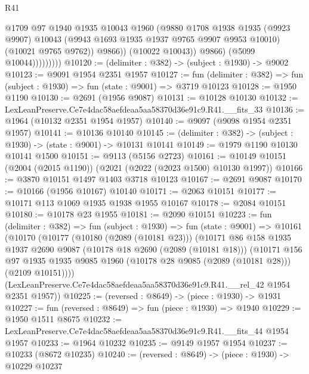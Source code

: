 \begin{lexlean}{R41}
\begin{coremodule}
                            @1709
                            @97
                            @1940
                            @1935
                            @10043
                            @1960
                            (@9880
                              @1708
                              @1938
                              @1935
                              (@9923 @9907)
                              @10043
                              (@9943 @1693 @1935 @1937 @9765 @9907 @9953 @10010)
                              (@10021 @9765 @9762))
                            @9866))
                        (@10022 @10043))
                      @9866)
                    (@5099 @10044)))))))))
@10120 := (delimiter : @382) -> (subject : @1930) -> @9002
@10123 := @9091 @1954 @2351 @1957
@10127 := fun (delimiter : @382) => fun (subject : @1930) => fun (state : @9001) => @3719 @10123
@10128 := @1950 @1190
@10130 := @2691 (@1956 @9087)
@10131 := @10128 @10130
@10132 := LexLeanPreserve.Ce7e4dac58aefdeaa5aa58370d36e91c9.R41.__fits_33
@10136 := @1964 (@10132 @2351 @1954 @1957)
@10140 := @9097 (@9098 @1954 @2351 @1957)
@10141 := @10136 @10140
@10145 := (delimiter : @382) -> (subject : @1930) -> (state : @9001) -> @10131 @10141
@10149 := @1979 @1190 @10130 @10141 @1500
@10151 := @9113 (@5156 @2723)
@10161 := @10149 @10151 (@2004 (@2015 @1190)) (@2021 (@2022 (@2023 @1500) @10130 @1997))
@10166 := @3870 @10151 @1497 @1403 @3718 @10123
@10167 := @2691 @9087
@10170 := @10166 (@1956 @10167) @10140
@10171 := @2063 @10151
@10177 := @10171 @113 @1069 @1935 @1938 @1955 @10167
@10178 := @2084 @10151
@10180 := @10178 @23 @1955
@10181 := @2090 @10151
@10223 := fun (delimiter : @382) =>
  fun (subject : @1930) =>
  fun (state : @9001) =>
  @10161
    (@10170
      (@10177
        (@10180 (@2089 (@10181 @23)))
        (@10171
          @86
          @158
          @1935
          @1937
          @2690
          @9087
          (@10178 @18 @2690 (@2089 (@10181 @18)))
          (@10171
            @156
            @97
            @1935
            @1935
            @9085
            @1960
            (@10178 @28 @9085 (@2089 (@10181 @28)))
            (@2109 @10151))))
      (LexLeanPreserve.Ce7e4dac58aefdeaa5aa58370d36e91c9.R41.__rel_42 @1954 @2351 @1957))
@10225 := (reversed : @8649) -> (piece : @1930) -> @1931
@10227 := fun (reversed : @8649) => fun (piece : @1930) => @1940
@10229 := @1950 @1511 @8675
@10232 := LexLeanPreserve.Ce7e4dac58aefdeaa5aa58370d36e91c9.R41.__fits_44 @1954 @1957
@10233 := @1964 @10232
@10235 := @9149 @1957 @1954
@10237 := @10233 (@8672 @10235)
@10240 := (reversed : @8649) -> (piece : @1930) -> @10229 @10237

\end{coremodule}
\end{lexlean}

